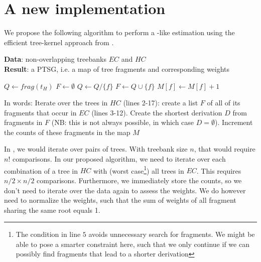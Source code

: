 \section{A new implementation}


We propose the following algorithm to perform a \dops{}-like estimation using the efficient tree-kernel approach from \ddop{}.

\begin{algorithm}[H]
{\bf Data}: non-overlapping treebanks $EC$ and $HC$\\
{\bf Result}: a PTSG, i.e. a map of tree fragments and corresponding weights\\
\begin{algorithmic}[1]
	\State $Q\gets frag(t_H)$
	\State $F \gets \emptyset$
				\State $Q\gets Q/\{f\}$	
				\State $F\gets Q\cup\{f\}$	
			\EndFor
		\EndFor
	\EndWhile
		\State $M[f]\gets M[f]+1$
	\EndFor
\EndFor
{}
\EndFor	
\end{algorithmic}
\end{algorithm}

In words:
Iterate over the trees in $HC$ (lines 2-17): create a list $F$ of all of its fragments that occur in $EC$ (lines 3-12). 
Create the shortest derivation $D$ from fragments in $F$ (NB: this is not always possible, in which case $D=\emptyset$). Increment the counts of these fragments in the map $M$

In \ddop, we would iterate over pairs of trees. With treebank size $n$, that would require $n!$ comparisons. In our proposed algorithm, we need to iterate over each combination of a tree in $HC$ with (worst case\footnote{The condition in line $5$ avoids unnecessary search for fragments. We might be able to pose a smarter constraint here, such that we only continue if we can possibly find fragments that lead to a shorter derivation}) all trees in $EC$. This requires $n/2 \times n/2$ comparisons. Furthermore, we immediately store the counts, so we don't need to iterate over the data again to assess the weights. We do however need to normalize the weights, such that the sum of weights of all fragment sharing the same root equals 1.